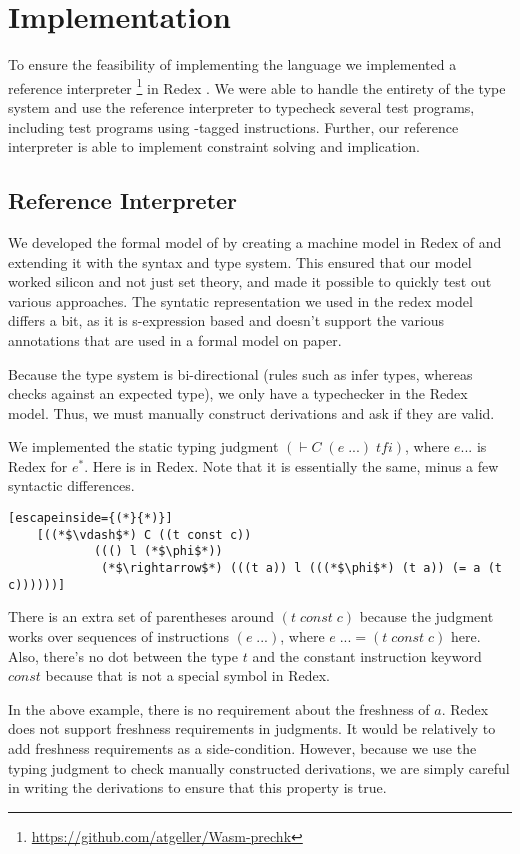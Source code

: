 \chapter{Implementation}
To ensure the feasibility of implementing the \name language we implemented a reference interpreter \footnote{\hyperlink{https://github.com/atgeller/Wasm-prechk}{https://github.com/atgeller/Wasm-prechk}} in Redex \cite{redex}.
We were able to handle the entirety of the type system and use the reference interpreter to typecheck several test programs, including test programs using \prechk-tagged instructions.
Further, our reference interpreter is able to implement constraint solving and implication.

\section{Reference Interpreter}
We developed the formal model of \name by creating a machine model in Redex of \wasm and extending it with the \name syntax and type system.
This ensured that our model worked silicon and not just set theory, and made it possible to quickly test out various approaches.
The syntatic representation we used in the redex model differs a bit, as it is s-expression based and doesn't support the various annotations that are used in a formal model on paper.

Because the \name type system is bi-directional (rules such as  infer types, whereas  checks against an expected type), we only have a typechecker in the Redex model.
Thus, we must manually construct derivations and ask if they are valid.

We implemented the static typing judgment $(\vdash C\; (e\;...)\; tfi)$, where $e ...$ is Redex for $e^{*}$.
Here is  in Redex.
Note that it is essentially the same, minus a few syntactic differences.
\begin{lstlisting}[escapeinside={(*}{*)}]
    [((*$\vdash$*) C ((t const c))
            ((() l (*$\phi$*))
             (*$\rightarrow$*) (((t a)) l (((*$\phi$*) (t a)) (= a (t c))))))]
\end{lstlisting}
There is an extra set of parentheses around $(t\;const\;c)$ because the judgment works over sequences of instructions $(e\;...)$, where $e\;... = (t\;const\;c)$ here.
Also, there's no dot between the type $t$ and the constant instruction keyword $const$ because that is not a special symbol in Redex.

In the above example, there is no requirement about the freshness of $a$.
Redex does not support freshness requirements in judgments.
It would be relatively to add freshness requirements as a side-condition.
However, because we use the typing judgment to check manually constructed derivations, we are simply careful in writing the derivations to ensure that this property is true.

